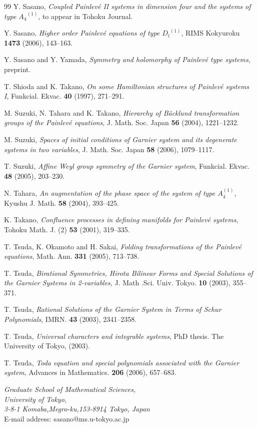 \begin{thebibliography}{99}
 Y. Sasano, {\em Coupled Painlev\'e II systems in dimension four and the systems of type ${A_4}^{(1)}$}, to appear in Tohoku Journal.

 Y. Sasano, {\em Higher order Painlev\'e equations of type ${D_l}^{(1)}$}, RIMS Kokyuroku {\bf 1473} (2006), 143--163.


 Y. Sasano and Y. Yamada, {\em Symmetry and holomorphy of Painlev\'e type systems}, preprint.




 T. Shioda and K. Takano, {\em On some Hamiltonian structures of Painlev\'e systems I}, Funkcial. Ekvac. {\bf 40} (1997), 271--291.



 M. Suzuki, N. Tahara and K. Takano, {\em Hierarchy of B\"{a}cklund transformation groups of the Painlev\'e equations}, J. Math. Soc. Japan {\bf 56} (2004), 1221--1232.

 M. Suzuki, {\em Spaces of initial conditions of Garnier system and its degenerate systems in two variables}, J. Math. Soc. Japan {\bf 58} (2006), 1079--1117.


 T. Suzuki, {\em Affine Weyl group symmetry of the Garnier system}, Funkcial. Ekvac. {\bf 48} (2005), 203--230.


 N. Tahara, {\em An augmentation of the phase space of the system of type $A_4^{(1)}$}, Kyushu J. Math. {\bf 58} (2004), 393--425. 



 K. Takano, {\em Confluence processes in defining manifolds for Painlev\'e systems}, Tohoku Math. J. (2) {\bf 53} (2001), 319--335.




 T. Tsuda, K. Okamoto and H. Sakai, {\em Folding transformations of the Painlev\'e equations}, Math. Ann. {\bf 331} (2005), 713--738.

 T. Tsuda, {\em Birational Symmetries, Hirota Bilinear Forms and Special Solutions of the Garnier Systems in 2-variables}, J. Math .Sci. Univ. Tokyo. {\bf 10} (2003), 355--371.

 T. Tsuda, {\em Rational Solutions of the Garnier System in Terms of Schur Polynomials}, IMRN. {\bf 43} (2003), 2341--2358.

 T. Tsuda, {\em Universal characters and integrable systems}, PhD thesis. The University of Tokyo, (2003).

 T. Tsuda, {\em Toda equation and special polynomials associated with the Garnier system}, Advances in Mathematics. {\bf 206} (2006), 657--683.


\end{thebibliography}





\begin{flushleft}{\it
Graduate School of Mathematical Sciences,\\
University of Tokyo,\\
3-8-1 Komaba,Megro-ku,153-8914 Tokyo, Japan\\
\it}
{\rm
E-mail address: sasano@ms.u-tokyo.ac.jp
\rm}
\end{flushleft}




